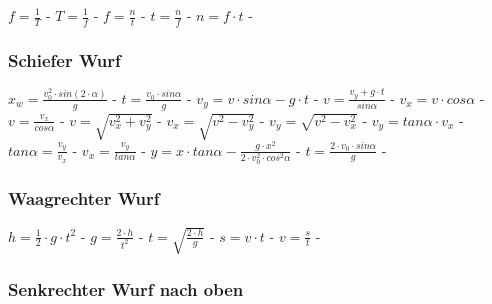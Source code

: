$ f = \frac{1}{T} $ - $ T = \frac{1}{f} $ - $ f = \frac{n}{t} $ - $ t = \frac{n}{f} $ - $ n = f\cdot t $ - \\ 
 
\subsubsection{Schiefer Wurf} 
\begin{minipage}{0.45\textwidth} 
\end{minipage} 
\begin{minipage}{0.45\textwidth} 
 
\legende{}\end{minipage} 
 
$ x_{w}  = \frac{v_{0} ^{2} \cdot sin(2\cdot \alpha )}{       g} $ - $ t =\frac{v_{0} \cdot sin \alpha }{  g} $ - $ v_{y}  =  v\cdot sin\alpha - g\cdot t $ - $ v= \frac{ v_{y} +g\cdot t}{ sin\alpha } $ - $ v_{x}  = v\cdot  cos\alpha $ - $ v= \frac{ v_{x} }{ cos\alpha } $ - $ v= \sqrt{ v_{x} ^{2} + v_{y} ^{2} } $ - $ v_{x} = \sqrt{ v^{2}  - v_{y} ^{2} } $ - $ v_{y} = \sqrt{ v^{2}  - v_{x} ^{2} } $ - $ v_{y} = tan \alpha \cdot  v_{x} $ - $ tan \alpha = \frac{v_{y} }{v_{x} } $ - $ v_{x} = \frac{v_{y} }{tan \alpha } $ - $ y = x\cdot tan \alpha  - \frac{   g\cdot x^{2} }{2\cdot v^{2} _{0} \cdot cos ^{2}\alpha } $ - $ t =\frac{2\cdot v_{0} \cdot sin \alpha }{ g} $ - \\ 
 
\subsubsection{Waagrechter Wurf} 
\begin{minipage}{0.45\textwidth} 
\end{minipage} 
\begin{minipage}{0.45\textwidth} 
 
\legende{}\end{minipage} 
 
$ h = \frac{1}{2}\cdot g\cdot t^{2} $ - $ g = \frac{2\cdot h}{t^{2} } $ - $ t = \sqrt{\frac{2\cdot h}{g}} $ - $ s = v\cdot t $ - $ v = \frac{s}{t} $ - \\ 
 
\subsubsection{Senkrechter Wurf nach oben} 
\begin{minipage}{0.45\textwidth} 
\end{minipage} 
\begin{minipage}{0.45\textwidth} 
 
\legende{}\end{minipage} 
 
